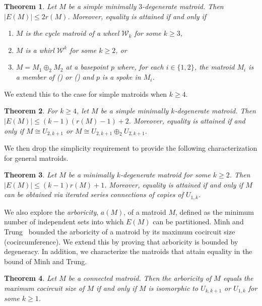 \documentclass{amsart}
\newcommand{\romannum}[1]{\romannumeral#1\relax}
\newtheorem{theorem}{Theorem}[section]
\theoremstyle{definition}
\theoremstyle{remark}
\numberwithin{equation}{section}
\begin{document}
\begin{theorem}\label{thm: simple min 3-degen}
Let $M$ be a simple minimally $3$-degenerate matroid. Then $|E(M)|\leq 2r(M)$.
Moreover, equality is attained if and only if
\begin{enumerate}
    \item[(\romannum{1})] $M$ is the cycle matroid of a wheel $\mathcal{W}_k$ for some $k\geq 3$,
    \item[(\romannum{2})] $M$ is a whirl $\mathcal{W}^k$ for some $k\ge 2$, or
    \item[(\romannum{3})] $M=M_1\oplus_2 M_2$ at a basepoint $p$ where, for each $i\in \{1,2\}$, the matroid $M_i$ is a member of (\romannum{1}) or (\romannum{2}) and $p$ is a spoke in $M_i$.
\end{enumerate}
\end{theorem}

We extend this to the case for simple matroids when $k \geq 4$.

\begin{theorem}\label{thm: simple min k-degen}
For $k \geq 4$, let $M$ be a simple minimally $k$-degenerate matroid. Then $|E(M)| \leq (k-1)(r(M)-1)+2$. Moreover, equality is attained if and only if $M \cong U_{2,k+1}$ or $M \cong U_{2,k+1} \oplus_2 U_{2,k+1}$.
\end{theorem}

We then drop the simplicity requirement to provide the following characterization for general matroids.

\begin{theorem}\label{thm: non-simple min k-degen}
Let $M$ be a minimally $k$-degenerate matroid for some $k\geq 2$. Then $|E(M)|\leq (k-1)r(M)+1$. Moreover, equality is attained if and only if $M$ can be obtained via iterated series connections of copies of $U_{1,k}$. 
\end{theorem}

We also explore the \textit{arboricity}, $a(M)$, of a matroid $M$, defined as the minimum number of independent sets into which $E(M)$ can be partitioned. Minh and Trung~\cite{nguyen} bounded the arboricity of a matroid by its maximum cocircuit size (cocircumference). We extend this by proving that arboricity is bounded by degeneracy. In addition, we characterize the matroids that attain equality in the bound of Minh and Trung.

\begin{theorem}
\label{thm: equality_arboricity_intro}
Let $M$ be a connected matroid. Then the arboricity of $M$ equals the maximum cocircuit size of $M$ if and only if $M$ is isomorphic to $U_{k,k+1}$ or $U_{1,k}$ for some $k \geq 1$.
\end{theorem}
\end{document}
